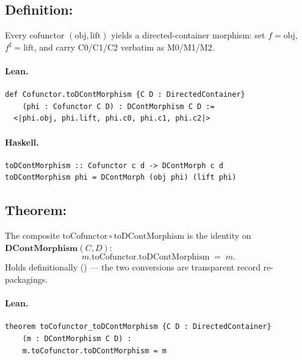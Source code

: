\documentclass[11pt,a4paper]{article}
\begin{document}
\subsection{Definition: }

\begin{defn}
Every cofunctor $(\mathrm{obj}, \mathrm{lift})$ yields a directed-container
morphism: set $f = \mathrm{obj}$, $f^\sharp = \mathrm{lift}$, and carry
C0/C1/C2 verbatim as M0/M1/M2.
\end{defn}

\paragraph{Lean.}
\begin{lstlisting}[style=lean]
def Cofunctor.toDContMorphism {C D : DirectedContainer}
    (phi : Cofunctor C D) : DContMorphism C D :=
  <|phi.obj, phi.lift, phi.c0, phi.c1, phi.c2|>
\end{lstlisting}

\paragraph{Haskell.}
\begin{lstlisting}[style=haskell]
toDContMorphism :: Cofunctor c d -> DContMorph c d
toDContMorphism phi = DContMorph (obj phi) (lift phi)
\end{lstlisting}


\subsection{Theorem: }

\begin{thm}
The composite $\mathrm{toCofunctor} \circ \mathrm{toDContMorphism}$ is the
identity on $\mathbf{DContMorphism}(C,D)$:
\[
  m.\mathrm{toCofunctor}.\mathrm{toDContMorphism} \;=\; m.
\]
Holds definitionally () --- the two conversions are transparent
record re-packagings.
\end{thm}

\paragraph{Lean.}
\begin{lstlisting}[style=lean]
theorem toCofunctor_toDContMorphism {C D : DirectedContainer}
    (m : DContMorphism C D) :
    m.toCofunctor.toDContMorphism = m
\end{lstlisting}
\end{document}

